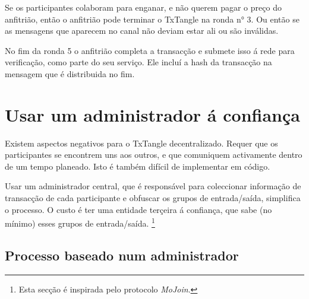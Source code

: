 Se os participantes colaboram para enganar, e não querem pagar o preço do anfitrião, então o anfitrião pode terminar o TxTangle na ronda n° 3. Ou então se as mensagens que aparecem no canal não deviam estar ali ou são inválidas. 


No fim da ronda 5 o anfitrião completa a transacção e submete isso á rede para verificação, como parte do seu serviço. Ele incluí a hash da transacção na mensagem que é distribuida no fim.


\section{Usar um administrador á confiança}

\label{sec:dealer-txtangle}

Existem aspectos negativos para o TxTangle decentralizado. Requer que os participantes se encontrem uns aos outros, e que comuniquem activamente dentro de um tempo planeado. Isto é também difícil de implementar em código. 

Usar um administrador central, que é responsável para coleccionar informação de transacção de cada participante e obfuscar os grupos de entrada/saída, simplifica o processo. O custo é ter uma entidade terçeira á confiança, que sabe (no mínimo) esses grupos de entrada/saída.
\footnote{Esta secção é inspirada pelo protocolo {\em MoJoin}.}

\subsection{Processo baseado num administrador}
\label{subsec:dealer-procedure-txtangle}

